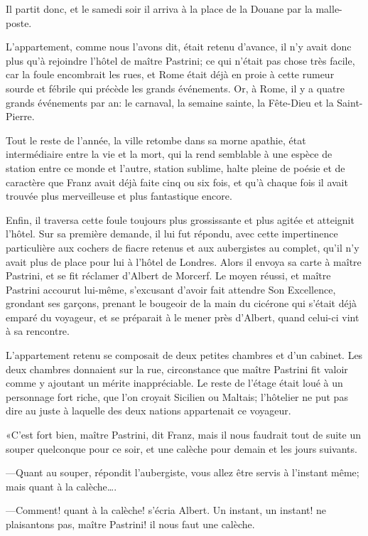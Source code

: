 Il partit donc, et le samedi soir il arriva à la place de la Douane par la malle-poste. 

L'appartement, comme nous l'avons dit, était retenu d'avance, il n'y avait donc plus qu'à rejoindre l'hôtel de maître Pastrini; ce qui n'était pas chose très facile, car la foule encombrait les rues, et Rome était déjà en proie à cette rumeur sourde et fébrile qui précède les grands événements. Or, à Rome, il y a quatre grands événements par an: le carnaval, la semaine sainte, la Fête-Dieu et la Saint-Pierre. 

Tout le reste de l'année, la ville retombe dans sa morne apathie, état intermédiaire entre la vie et la mort, qui la rend semblable à une espèce de station entre ce monde et l'autre, station sublime, halte pleine de poésie et de caractère que Franz avait déjà faite cinq ou six fois, et qu'à chaque fois il avait trouvée plus merveilleuse et plus fantastique encore. 

Enfin, il traversa cette foule toujours plus grossissante et plus agitée et atteignit l'hôtel. Sur sa première demande, il lui fut répondu, avec cette impertinence particulière aux cochers de fiacre retenus et aux aubergistes au complet, qu'il n'y avait plus de place pour lui à l'hôtel de Londres. Alors il envoya sa carte à maître Pastrini, et se fit réclamer d'Albert de Morcerf. Le moyen réussi, et maître Pastrini accourut lui-même, s'excusant d'avoir fait attendre Son Excellence, grondant ses garçons, prenant le bougeoir de la main du cicérone qui s'était déjà emparé du voyageur, et se préparait à le mener près d'Albert, quand celui-ci vint à sa rencontre. 

L'appartement retenu se composait de deux petites chambres et d'un cabinet. Les deux chambres donnaient sur la rue, circonstance que maître Pastrini fit valoir comme y ajoutant un mérite inappréciable. Le reste de l'étage était loué à un personnage fort riche, que l'on croyait Sicilien ou Maltais; l'hôtelier ne put pas dire au juste à laquelle des deux nations appartenait ce voyageur. 

«C'est fort bien, maître Pastrini, dit Franz, mais il nous faudrait tout de suite un souper quelconque pour ce soir, et une calèche pour demain et les jours suivants. 

—Quant au souper, répondit l'aubergiste, vous allez être servis à l'instant même; mais quant à la calèche\dots. 

—Comment! quant à la calèche! s'écria Albert. Un instant, un instant! ne plaisantons pas, maître Pastrini! il nous faut une calèche. 

